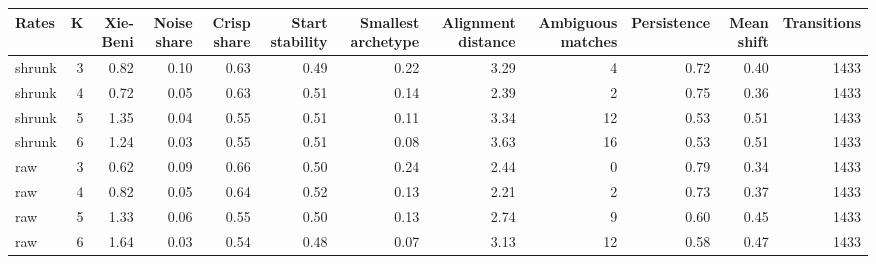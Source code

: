 \begin{tabular}{lrrrrrrrrrrr}
\toprule
Rates & K & Xie-Beni & Noise share & Crisp share & Start stability & Smallest archetype & Alignment distance & Ambiguous matches & Persistence & Mean shift & Transitions \\
\midrule
shrunk & 3 & 0.82 & 0.10 & 0.63 & 0.49 & 0.22 & 3.29 & 4 & 0.72 & 0.40 & 1433 \\
shrunk & 4 & 0.72 & 0.05 & 0.63 & 0.51 & 0.14 & 2.39 & 2 & 0.75 & 0.36 & 1433 \\
shrunk & 5 & 1.35 & 0.04 & 0.55 & 0.51 & 0.11 & 3.34 & 12 & 0.53 & 0.51 & 1433 \\
shrunk & 6 & 1.24 & 0.03 & 0.55 & 0.51 & 0.08 & 3.63 & 16 & 0.53 & 0.51 & 1433 \\
raw & 3 & 0.62 & 0.09 & 0.66 & 0.50 & 0.24 & 2.44 & 0 & 0.79 & 0.34 & 1433 \\
raw & 4 & 0.82 & 0.05 & 0.64 & 0.52 & 0.13 & 2.21 & 2 & 0.73 & 0.37 & 1433 \\
raw & 5 & 1.33 & 0.06 & 0.55 & 0.50 & 0.13 & 2.74 & 9 & 0.60 & 0.45 & 1433 \\
raw & 6 & 1.64 & 0.03 & 0.54 & 0.48 & 0.07 & 3.13 & 12 & 0.58 & 0.47 & 1433 \\
\bottomrule
\end{tabular}
